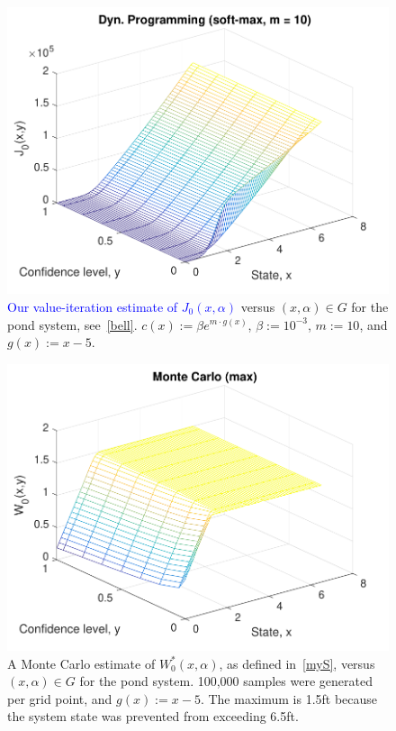\documentclass[letterpaper, 10 pt, conference]{ieeeconf}  %
\begin{document}
\begin{figure}[thpb]
      \centering
      \includegraphics[scale=0.5]{dyn_prog_J0_sept112018.pdf}
      \caption{\textcolor{blue}{Our value-iteration estimate of $J_0(x,\alpha)$} versus $(x, \alpha) \in G$ for the pond system, see~\eqref{bell}.
	  $c(x) := \beta e^{m\cdot g(x)}$, $\beta := 10^{-3}$, $m := 10$, and $g(x) := x-5$.}
      \label{J0dp}
\end{figure}

\begin{figure}[thpb]
      \centering
      \includegraphics[scale=0.5]{monte_carlo_max_sept112018.pdf}
      \caption{A Monte Carlo estimate of $W_0^*(x,\alpha)$, as defined in~\eqref{myS}, versus $(x, \alpha) \in G$ for the pond system.
	  100,000 samples were generated per grid point, and $g(x) := x - 5$. 
	  The maximum is 1.5ft because the system state was prevented from exceeding 6.5ft.}
      \label{W0mc}
\end{figure}
\end{document}

